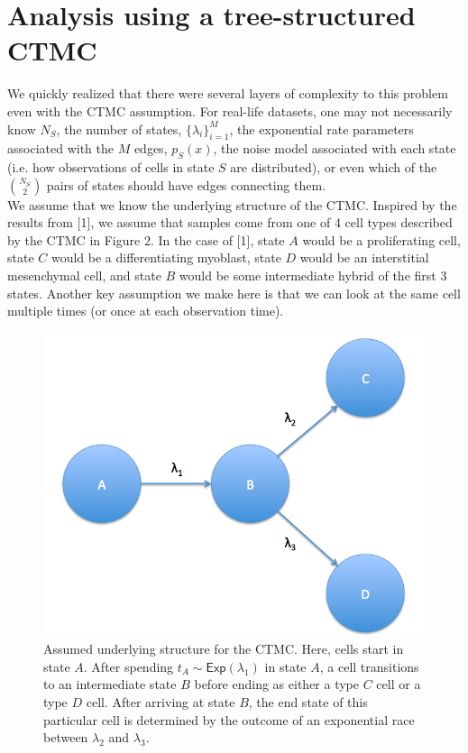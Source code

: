 \documentclass[11pt,onecolumn]{article}
\begin{document}
\section{Analysis using a tree-structured CTMC}
We quickly realized that there were several layers of complexity to this problem even with the CTMC assumption. For real-life datasets, one may not necessarily know $N_S$, the number of states, $\{\lambda_i\}_{i=1}^M$, the exponential rate parameters associated with the $M$ edges, $p_S(x)$, the noise model associated with each state (i.e. how observations of cells in state $S$ are distributed), or even which of the $N_S \choose 2$ pairs of states should have edges connecting them. \\

We assume that we know the underlying structure of the CTMC. Inspired by the results from [1], we assume that samples come from one of 4 cell types described by the CTMC in Figure 2. In the case of [1], state $A$ would be a proliferating cell, state $C$ would be a differentiating myoblast, state $D$ would be an interstitial mesenchymal cell, and state $B$ would be some intermediate hybrid of the first 3 states. Another key assumption we make here is that we can look at the same cell multiple times (or once at each observation time). \\

\begin{figure}[!htb]
		\captionsetup{width=.8\linewidth}
		\caption{Assumed underlying structure for the CTMC. Here, cells start in state $A$. After spending $t_A \sim \textsf{Exp}(\lambda_1) $ in state $A$, a cell transitions to an intermediate state $B$ before ending as either a type $C$ cell or a type $D$ cell. After arriving at state $B$, the end state of this particular cell is determined by the outcome of an exponential race between $\lambda_2$ and $\lambda_3$.}
		\centering
		\includegraphics[scale=0.2]{Fig1.png}
\end{figure}
\end{document}
